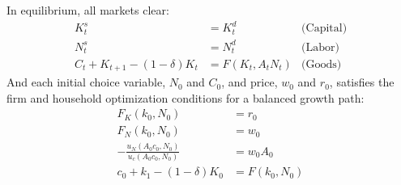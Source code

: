 \documentclass{article}
\begin{document}
\begin{enumerate}[(a)]
		In equilibrium, all markets clear:
		\begin{align*}
			K_t^s &= K_t^d									&\text{(Capital)}	\\
			N_t^s &= N_t^d 									&\text{(Labor)}		\\
			C_t + K_{t+1} - (1-\delta)K_t &= F(K_t,A_tN_t)	&\text{(Goods)}
		\end{align*}
		And each initial choice variable, $N_0$ and $C_0$, and price, $w_0$ and $r_0$, satisfies the firm and household optimization conditions for a balanced growth path:
		\begin{align*}
			F_K(k_0,N_0) &= r_0									\\
			F_N(k_0,N_0) &= w_0									\\
			-\frac{u_N(A_0c_0,N_0)}{u_c(A_0c_0,N_0)} &= w_0A_0	\\
			c_0 + k_{1} - (1-\delta)K_0 &= F(k_0,N_0)
		\end{align*}
	

\end{enumerate}
\end{document}
